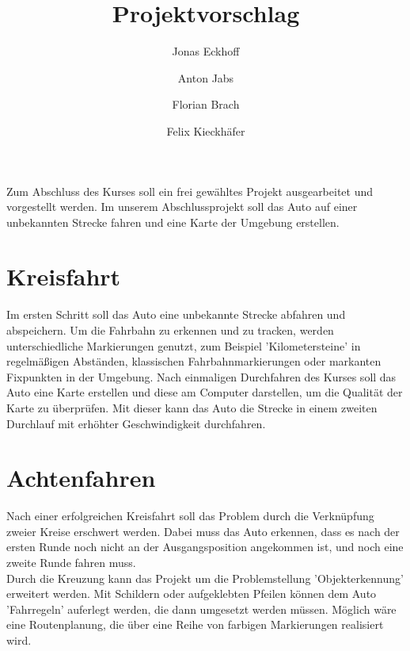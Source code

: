 \documentclass[DIV=15, notitlepage,10pt]{article}
\begin{document}
\title{Projektvorschlag}

\author{
  Jonas Eckhoff
  \and
  Anton Jabs
  \and
  Florian Brach
  \and
  Felix Kieckhäfer
}





\maketitle
Zum Abschluss des Kurses soll ein frei gewähltes Projekt ausgearbeitet und vorgestellt werden. 
Im unserem Abschlussprojekt soll das Auto auf einer unbekannten Strecke fahren und eine Karte der Umgebung erstellen. 
\section{Kreisfahrt}
Im ersten Schritt soll das Auto eine unbekannte Strecke abfahren und abspeichern. Um die Fahrbahn zu erkennen und zu tracken, werden unterschiedliche Markierungen genutzt, zum Beispiel 'Kilometersteine' in regelmäßigen Abständen, klassischen Fahrbahnmarkierungen oder markanten Fixpunkten in der Umgebung. 
Nach einmaligen Durchfahren des Kurses soll das Auto eine Karte erstellen und diese am Computer darstellen, um die Qualität der Karte zu überprüfen. 
Mit dieser kann das Auto die Strecke in einem zweiten Durchlauf mit erhöhter Geschwindigkeit durchfahren. 
  
\section{Achtenfahren}
Nach einer erfolgreichen Kreisfahrt soll das Problem durch die Verknüpfung zweier Kreise erschwert werden. Dabei muss das Auto erkennen, dass es nach der ersten Runde noch nicht an der Ausgangsposition angekommen ist, und noch eine zweite Runde fahren muss. \\
Durch die Kreuzung kann das Projekt um die Problemstellung 'Objekterkennung' erweitert werden. Mit Schildern oder aufgeklebten Pfeilen können dem Auto 'Fahrregeln' auferlegt werden, die dann umgesetzt werden müssen. Möglich wäre eine Routenplanung, die über eine Reihe von farbigen Markierungen realisiert wird. 
\end{document}
